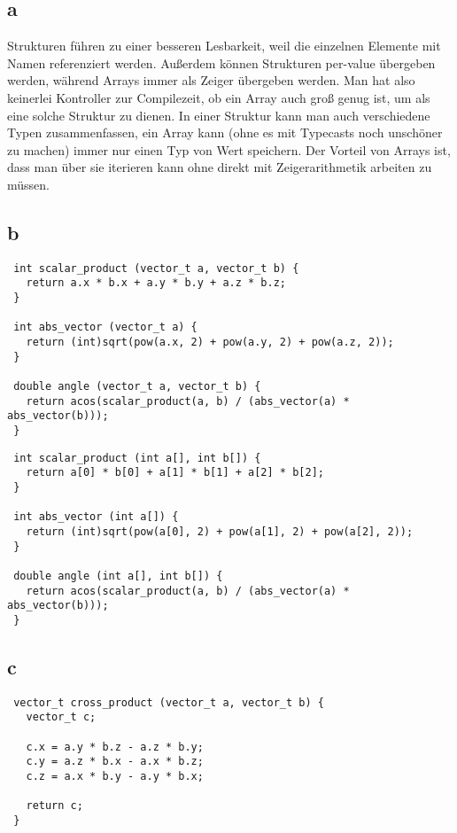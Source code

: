 \documentclass[a4paper,10pt]{article}
\begin{document}
\subsection*{a}

Strukturen führen zu einer besseren Lesbarkeit, weil die einzelnen Elemente mit Namen referenziert werden.
Außerdem können Strukturen per-value übergeben werden, während Arrays immer als Zeiger übergeben werden.
Man hat also keinerlei Kontroller zur Compilezeit, ob ein Array auch groß genug ist, um als eine solche Struktur zu dienen.
In einer Struktur kann man auch verschiedene Typen zusammenfassen, ein Array kann (ohne es mit Typecasts noch unschöner zu machen) immer nur einen Typ von Wert speichern.
Der Vorteil von Arrays ist, dass man über sie iterieren kann ohne direkt mit Zeigerarithmetik arbeiten zu müssen.

\subsection*{b}

\begin{lstlisting}
 int scalar_product (vector_t a, vector_t b) {
   return a.x * b.x + a.y * b.y + a.z * b.z;
 }
 
 int abs_vector (vector_t a) {
   return (int)sqrt(pow(a.x, 2) + pow(a.y, 2) + pow(a.z, 2));
 }

 double angle (vector_t a, vector_t b) {
   return acos(scalar_product(a, b) / (abs_vector(a) * abs_vector(b)));
 }
\end{lstlisting}

\begin{lstlisting}
 int scalar_product (int a[], int b[]) {
   return a[0] * b[0] + a[1] * b[1] + a[2] * b[2];
 }
 
 int abs_vector (int a[]) {
   return (int)sqrt(pow(a[0], 2) + pow(a[1], 2) + pow(a[2], 2));
 }

 double angle (int a[], int b[]) {
   return acos(scalar_product(a, b) / (abs_vector(a) * abs_vector(b)));
 }
\end{lstlisting}

\subsection*{c}

\begin{lstlisting}
 vector_t cross_product (vector_t a, vector_t b) {
   vector_t c;
  
   c.x = a.y * b.z - a.z * b.y;
   c.y = a.z * b.x - a.x * b.z;
   c.z = a.x * b.y - a.y * b.x;
  
   return c;
 }
\end{lstlisting}
\end{document}
